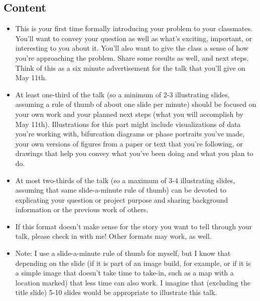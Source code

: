 \documentclass[12pt,letterpaper,noanswers]{exam}
\begin{document}
\subsection{Content}
\begin{itemize}
\item
This is your first time formally introducing your problem to your classmates.  You'll want to convey your question as well as what's exciting, important, or interesting to you about it.  You'll also want to give the class a sense of how you're approaching the problem.  Share some results as well, and next steps.  Think of this as a six minute advertisement for the talk that you'll give on May 11th.

\item
At least one-third of the talk (so a minimum of 2-3 illustrating slides, assuming a rule of thumb of about one slide per minute) should be focused on your own work and your planned next steps (what you will accomplish by May 11th).  Illustrations for this part might include visualizations of data you're working with, bifurcation diagrams or phase portraits you've made, your own versions of figures from a paper or text that you're following, or drawings that help you convey what you've been doing and what you plan to do.

\item
At most two-thirds of the talk (so a maximum of 3-4 illustrating slides, assuming that same slide-a-minute rule of thumb) can be devoted to explicating your question or project purpose and sharing background information or the previous work of others.  

\item If this format doesn't make sense for the story you want to tell through your talk, please check in with me!  Other formats may work, as well.

\item Note: I use a slide-a-minute rule of thumb for myself, but I know that depending on the slide (if it is part of an image build, for example, or if it is a simple image that doesn't take time to take-in, such as a map with a location marked) that less time can also work.  I imagine that (excluding the title slide) 5-10 slides would be appropriate to illustrate this talk.
\end{itemize}
\end{document}
